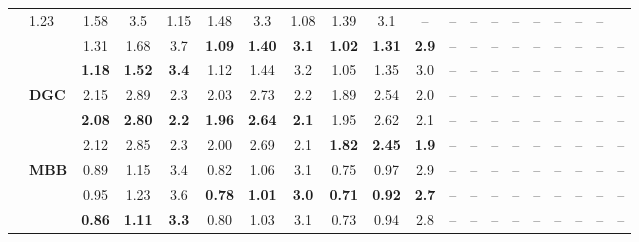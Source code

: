 \begin{table}[!t]
\begin{tabular*}{\textwidth}{@{\extracolsep{\fill}}llccc|ccc|ccc|ccc|ccc|ccc@{}}
  & 1.23 & 1.58 & 3.5 & 1.15 & 1.48 & 3.3 & 1.08 & 1.39 & 3.1
  & -- & -- & -- & -- & -- & -- & -- & -- & -- \\
& 
  & 1.31 & 1.68 & 3.7 & \textbf{1.09} & \textbf{1.40} & \textbf{3.1} & \textbf{1.02} & \textbf{1.31} & \textbf{2.9}
  & -- & -- & -- & -- & -- & -- & -- & -- & -- \\
& 
  & \textbf{1.18} & \textbf{1.52} & \textbf{3.4} & 1.12 & 1.44 & 3.2 & 1.05 & 1.35 & 3.0
  & -- & -- & -- & -- & -- & -- & -- & -- & -- \\
& \multirow{3}{*}{\textbf{DGC}} 
  & 2.15 & 2.89 & 2.3 & 2.03 & 2.73 & 2.2 & 1.89 & 2.54 & 2.0
  & -- & -- & -- & -- & -- & -- & -- & -- & -- \\
& 
  & \textbf{2.08} & \textbf{2.80} & \textbf{2.2} & \textbf{1.96} & \textbf{2.64} & \textbf{2.1} & 1.95 & 2.62 & 2.1
  & -- & -- & -- & -- & -- & -- & -- & -- & -- \\
& 
  & 2.12 & 2.85 & 2.3 & 2.00 & 2.69 & 2.1 & \textbf{1.82} & \textbf{2.45} & \textbf{1.9}
  & -- & -- & -- & -- & -- & -- & -- & -- & -- \\
& \multirow{3}{*}{\textbf{MBB}} 
  & 0.89 & 1.15 & 3.4 & 0.82 & 1.06 & 3.1 & 0.75 & 0.97 & 2.9
  & -- & -- & -- & -- & -- & -- & -- & -- & -- \\
& 
  & 0.95 & 1.23 & 3.6 & \textbf{0.78} & \textbf{1.01} & \textbf{3.0} & \textbf{0.71} & \textbf{0.92} & \textbf{2.7}
  & -- & -- & -- & -- & -- & -- & -- & -- & -- \\
& 
  & \textbf{0.86} & \textbf{1.11} & \textbf{3.3} & 0.80 & 1.03 & 3.1 & 0.73 & 0.94 & 2.8
  & -- & -- & -- & -- & -- & -- & -- & -- & -- \\
\midrule


\end{tabular*}
\end{table}
